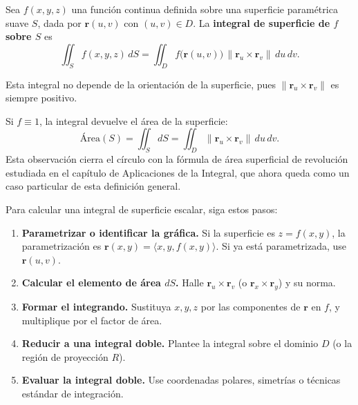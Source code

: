 \begin{definition}
Sea $f(x,y,z)$ una función continua definida sobre una superficie paramétrica suave $S$, dada por $\mathbf{r}(u,v)$ con $(u,v)\in D$. La \textbf{integral de superficie de $f$ sobre $S$} es
\[
\iint_S f(x,y,z)\,dS
=
\iint_D f\bigl(\mathbf{r}(u,v)\bigr)\,\|\mathbf{r}_u \times \mathbf{r}_v\|\,du\,dv.
\]
\end{definition}

Esta integral no depende de la orientación de la superficie, pues $\| \mathbf{r}_u \times \mathbf{r}_v \|$ es siempre positivo.

\begin{rem}
Si $f\equiv 1$, la integral devuelve el área de la superficie:
\[
\text{Área}(S) = \iint_S dS = \iint_D \|\mathbf{r}_u \times \mathbf{r}_v\|\,du\,dv.
\]
Esta observación cierra el círculo con la fórmula de área superficial de revolución estudiada en el capítulo de Aplicaciones de la Integral, que ahora queda como un caso particular de esta definición general.
\end{rem}

\begin{pasos}
Para calcular una integral de superficie escalar, siga estos pasos:
\begin{enumerate}
\item \textbf{Parametrizar o identificar la gráfica.} Si la superficie es $z=f(x,y)$, la parametrización es $\mathbf{r}(x,y)=\langle x,y,f(x,y)\rangle$. Si ya está parametrizada, use $\mathbf{r}(u,v)$.
\item \textbf{Calcular el elemento de área $dS$.} Halle $\mathbf{r}_u \times \mathbf{r}_v$ (o $ \mathbf{r}_x \times \mathbf{r}_y$) y su norma.
\item \textbf{Formar el integrando.} Sustituya $x,y,z$ por las componentes de $\mathbf{r}$ en $f$, y multiplique por el factor de área.
\item \textbf{Reducir a una integral doble.} Plantee la integral sobre el dominio $D$ (o la región de proyección $R$).
\item \textbf{Evaluar la integral doble.} Use coordenadas polares, simetrías o técnicas estándar de integración.
\end{enumerate}
\end{pasos}

